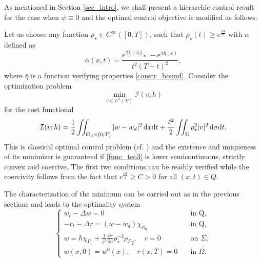 \documentclass{aims}
\theoremstyle{definition}
\newcommand\csin[1]{\chi_{#1}}
\def\csbd{\rho_{\Gamma}}
\def\dx{\,\textnormal{d}x}
\def\dt{\textnormal{d}t}
\def\d{\,\textnormal{d}}
\begin{document}
As mentioned in Section \ref{sec_intro}, we shall present a hierarchic control result for the case when $\psi\equiv 0$ and the optimal control objective is modified as follows. 

Let us choose any function $\rho_\star\in C^\infty([0,T])$, such that $\rho_\star(t)\geq e^{\frac{s\bar\alpha}{2}}$ with $\alpha$ defined as
%
\begin{equation*}
\bar\alpha(x,t)=\frac{e^{2\lambda\|\bar\eta\|_{\infty}}-e^{\lambda\bar\eta(x)}}{t^2(T-t)^2},
\end{equation*}
%
where $\bar\eta$ is a function verifying properties \eqref{constr_bound}. 
%
%
Consider the optimization problem
%
\begin{equation*}
\min_{v\in L^2(\Sigma)} \mathcal I(v;h)
\end{equation*}
%
for the cost functional
%
\begin{equation*}%
\mathcal I(v;h)=\frac{1}{2}\iint_{\mathcal O_d\times(0,T)}|w-w_d|^2\dx\dt+\frac{\ell^2}{2}\iint_{\Sigma}\rho_\star^2|v|^2\d\sigma\dt.
\end{equation*}
%
This is classical optimal control problem (cf. \cite{Lions_optim}) and the existence and uniqueness of its minimizer is  guaranteed if \eqref{func_teo3} is lower semicontinuous, strictly convex and coercive. The first two conditions can be readily verified while the coercivity follows from the fact that $e^{\frac{s\bar\alpha}{2}}\geq C>0$ for all $(x,t)\in Q$. 

The characterization of the minimum can be carried out as in the previous sections and leads to the optimality system
%
\begin{equation*}%
\begin{cases}
w_t-\Delta w=0 &\quad  \text{in Q}, \\
-r_t-\Delta r= (w-w_d)\chi_{\mathcal O_d}  &\quad  \text{in Q},\\ 
w=h\csin{\Gamma_1}+ \frac{1}{\ell^2}\frac{\partial r}{\partial n}\rho_\star^{-2}{\csbd}_2, \quad r=0 &\quad \text{on } \Sigma, \\
w(x,0)=w^0(x),\quad r(x,T)=0 &\quad \text{in } \Omega.
\end{cases}
\end{equation*}
\end{document}
